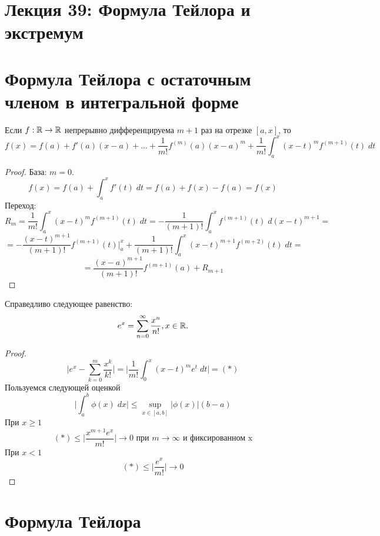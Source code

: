     \section*{Лекция 39: Формула Тейлора и экстремум}
    
    \section{Формула Тейлора с остаточным членом в интегральной форме}
    
    \begin{theorem}
    	Если $f: \mathbb R \rightarrow \mathbb R$ непрерывно дифференцируема $m + 1$ раз на отрезке $[a, x]$, то
    	\[ f(x) = f(a) + f'(a)(x - a) + ... + \frac{1}{m!}f^{(m)}(a)(x - a)^m + \frac{1}{m!} \int_a^x (x - t)^m f^{(m + 1)}(t) \; dt \]
    \end{theorem}
    
    \begin{proof}
    	База: $m = 0$.
    	\[ f(x) = f(a) + \int_a^x f'(t) \; dt = f(a) + f(x) - f(a) = f(x) \]
    	Переход:
    	\[ R_m = \frac{1}{m!} \int_a^x (x - t)^m f^{(m + 1)}(t) \; dt = -\frac{1}{(m + 1)!} \int_a^x f^{(m + 1)}(t) \; d(x - t)^{m + 1} = \]
    	\[ = -\frac{(x - t)^{m + 1}}{(m + 1)!} f^{(m + 1)}(t)\bigg|_a^x + \frac{1}{(m + 1)!} \int_a^x (x - t)^{m + 1} f^{(m + 2)}(t) \; dt = \]
    	\[ = \frac{(x - a)^{m + 1}}{(m + 1)!} f^{(m + 1)}(a) + R_{m + 1} \]
    \end{proof}
    
    \begin{corollary}
    	Справедливо следующее равенство:
    	\[ e^x = \sum_{n = 0}^{\infty} \frac{x^n}{n!}, x \in \mathbb R. \]
    \end{corollary}
    
    \begin{proof}
    	\[ \bigg|e^x - \sum_{k = 0}^m \frac{x^k}{k!}\bigg| = \bigg|\frac{1}{m!} \int_0^x (x - t)^m e^t \; dt\bigg| = (*) \]
    	Пользуемся следующей оценкой
    	\[ \bigg|\int_a^b \phi(x) \; dx\bigg| \leqslant \sup_{x \in [a, b]} |\phi(x)|(b - a) \]
    	При $x \geqslant 1$
    	\[ (*) \leqslant \bigg|\frac{x^{m + 1} e^x}{m!}\bigg| \to 0 \text{ при } m \to \infty \text{ и фиксированном x} \]
    	При $x < 1$
    	\[ (*) \leqslant \bigg|\frac{e^x}{m!}\bigg| \to 0 \]
    \end{proof}
    
    \section{Формула Тейлора}
    
